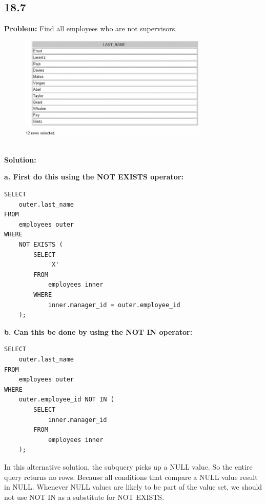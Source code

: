 \documentclass[12pt,a4paper]{article}
\begin{document}
\begin{itemize}
\subsection*{18.7}
\textbf{Problem:} Find all employees who are not supervisors.
\\
\begin{figure}[htbp]
  \centering
  \includegraphics[width=0.8\textwidth]{Screenshots/187.png}
\end{figure}\\
\textbf{Solution:}

\textbf{a. First do this using the NOT EXISTS operator:}
\begin{lstlisting}
SELECT 
    outer.last_name
FROM
    employees outer
WHERE
    NOT EXISTS (
        SELECT
            'X'
        FROM
            employees inner
        WHERE
            inner.manager_id = outer.employee_id
    );
\end{lstlisting}
\newpage
\textbf{b. Can this be done by using the NOT IN operator:}
\begin{lstlisting}
SELECT 
    outer.last_name
FROM
    employees outer
WHERE
    outer.employee_id NOT IN (
        SELECT
            inner.manager_id
        FROM
            employees inner
    );
\end{lstlisting}

In this alternative solution, the subquery picks up a NULL value. So the entire query returns no rows. Because  all conditions that compare a NULL value result in NULL. Whenever NULL values are likely to be part of the value set, we should not use NOT IN as a substitute for NOT EXISTS.


\end{itemize}
\end{document}
